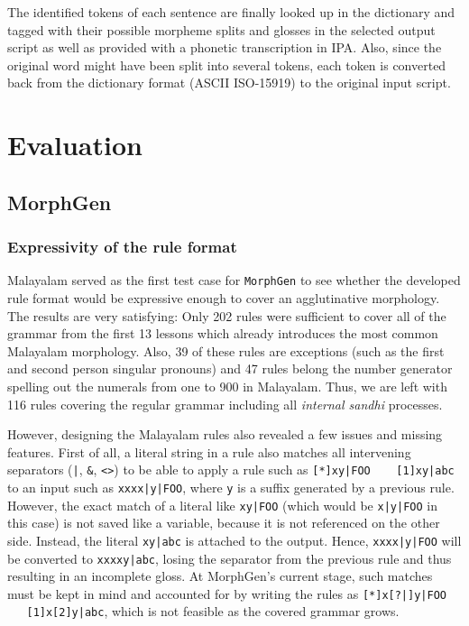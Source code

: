 \documentclass[a4paper]{article}
\newcommand{\tab}{~~~}
\newcommand{\typ}[1]{\texttt{#1}}
\begin{document}
The identified tokens of each sentence are finally looked up in the dictionary and tagged with their possible morpheme splits and glosses in the selected output script as well as provided with a phonetic transcription in IPA. Also, since the original word might have been split into several tokens, each token is converted back from the dictionary format (ASCII ISO-15919) to the original input script.


\section{Evaluation}

\subsection{MorphGen}

\subsubsection{Expressivity of the rule format}

Malayalam served as the first test case for \typ{MorphGen} to see whether the developed rule format would be expressive enough to cover an agglutinative morphology. The results are very satisfying: Only 202 rules were sufficient to cover all of the grammar from the first 13 \textcite{moag} lessons which already introduces the most common Malayalam morphology. Also, 39 of these rules are exceptions (such as the first and second person singular pronouns) and 47 rules belong the number generator spelling out the numerals from one to 900 in Malayalam. Thus, we are left with 116 rules covering the regular grammar including all \textit{internal sandhi} processes.

However, designing the Malayalam rules also revealed a few issues and missing features. First of all, a literal string in a rule also matches all intervening separators (\typ{|}, \typ{\&}, \typ{<>}) to be able to apply a rule such as \typ{[*]xy|FOO \tab [1]xy|abc} to an input such as \typ{xxxx|y|FOO}, where \typ{y} is a suffix generated by a previous rule. However, the exact match of a literal like \typ{xy|FOO} (which would be \typ{x|y|FOO} in this case) is not saved like a variable, because it is not referenced on the other side. Instead, the literal \typ{xy|abc} is attached to the output. Hence, \typ{xxxx|y|FOO} will be converted to \typ{xxxxy|abc}, losing the separator from the previous rule and thus resulting in an incomplete gloss. At MorphGen's current stage, such matches must be kept in mind and accounted for by writing the rules as \typ{[*]x[?|]y|FOO \tab [1]x[2]y|abc}, which is not feasible as the covered grammar grows.
\end{document}
